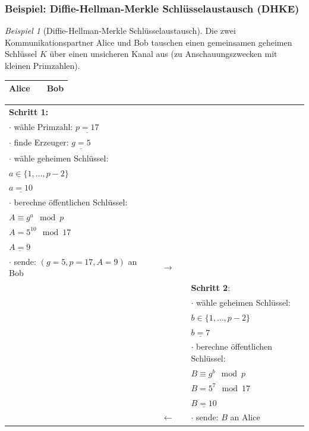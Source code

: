 \documentclass[
  a4paper,
  11pt,
]{scrartcl}
\theoremstyle{plain}
\theoremstyle{definition}
\theoremstyle{remark}
\newtheorem{beispiel}{Beispiel}
\begin{document}
\subsubsection{Beispiel: Diffie-Hellman-Merkle Schlüsselaustausch (DHKE)}
\label{sub:dhke_beispiel}
\begin{beispiel}[Diffie-Hellman-Merkle Schlüsselaustausch]\label{bsp:dhke}
  Die zwei Kommunikationspartner Alice und Bob tauschen einen gemeinsamen
  geheimen Schlüssel $K$ über einen unsicheren Kanal aus (zu Anschauungszwecken
  mit kleinen Primzahlen).
  \begin{center}
    \begin{tabularx}{\textwidth}{lXr}
      \textbf{Alice} & & \textbf{Bob}\\
      \midrule
    \end{tabularx}
    \begin{tabularx}{\textwidth}{lXcXl}
      \textbf{Schritt 1:} & & & & \\
      $\cdot$ wähle Primzahl: $\underline{p = 17}$ & & & & \\
      $\cdot$ finde Erzeuger: $\underline{g = 5}$ & & & & \\
      $\cdot$ wähle geheimen Schlüssel: & & & & \\
      $a \in \{1, \dots, p-2\}$ & & & & \\
      $\underline{a = 10}$ & & & & \\
      $\cdot$ berechne öffentlichen Schlüssel: & & & & \\
      $A \equiv g^a \mod p$ & & & & \\
      $A = 5^{10} \mod 17$ & & & & \\
      $\underline{A = 9}$ & & & & \\
      $\cdot$ sende: $(g = 5, p = 17, A = 9)$ an Bob & & $\to$ & & \\\midrule
      & & & & \textbf{Schritt 2}:\\
      & & & & $\cdot$ wähle geheimen Schlüssel:\\
      & & & & $b \in \{1, \dots, p-2\}$\\
      & & & & $\underline{b=7}$\\
      & & & & $\cdot$ berechne öffentlichen Schlüssel:\\
      & & & & $B \equiv g^b \mod p$\\
      & & & & $B = 5^7 \mod 17$\\
      & & & & $\underline{B = 10}$\\
      & & $\leftarrow$ & & $\cdot$ sende: $B$ an Alice\\\midrule

\end{tabularx}
\end{center}
\end{beispiel}
\end{document}
